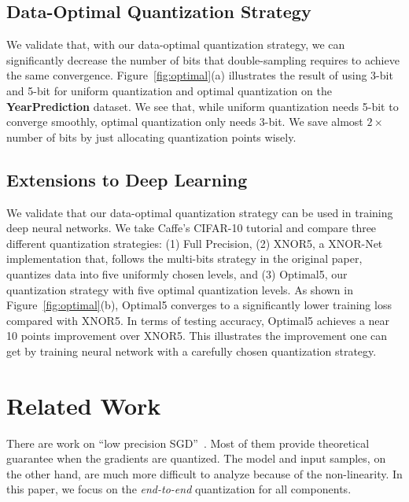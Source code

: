 \documentclass{article}
\begin{document}
\vspace{-0.5em}
\subsection{Data-Optimal Quantization Strategy}
\vspace{-0.5em}

We validate that, with our data-optimal quantization strategy, we can 
significantly decrease the number of 
bits that double-sampling requires to 
achieve the same convergence.
Figure~\ref{fig:optimal}(a) illustrates
the result of using 3-bit and 5-bit
for uniform quantization and optimal 
quantization on the {\bf YearPrediction}
dataset. We see that,
while uniform quantization needs 5-bit
to converge smoothly, optimal
quantization only needs 3-bit. 
We save almost $2\times$ number of 
bits by just allocating quantization points wisely.

\vspace{-0.5em}
\subsection{Extensions to Deep Learning}
\vspace{-0.5em}

We validate that our data-optimal quantization
strategy can be used in training deep neural
networks. We take Caffe's CIFAR-10 tutorial
and compare three different quantization
strategies: (1) Full Precision, (2) XNOR5, 
a XNOR-Net implementation that, follows
the multi-bits strategy in
the original paper, quantizes data into
five uniformly chosen levels, and (3)
Optimal5, our quantization strategy with
five optimal quantization levels. As
shown in Figure~\ref{fig:optimal}(b), Optimal5
converges to a significantly lower training 
loss compared with XNOR5. In terms of
testing accuracy, Optimal5 achieves a
near 10 points improvement over XNOR5.
This illustrates the improvement
one can get by training neural network with
a carefully chosen quantization strategy.


\vspace{-1em}
\section{Related Work} 

\vspace{-0.5em}
There are work on ``low precision SGD''~\cite{DeSa:NIPS:2015,Alistarh:2016:ArXiv}. 
Most of them provide
theoretical guarantee when the gradients are quantized.
The model and input samples, on the other hand, are much more difficult
to analyze because of the non-linearity. In this paper, 
we
focus on the {\em end-to-end}
quantization for all components.
\end{document}
